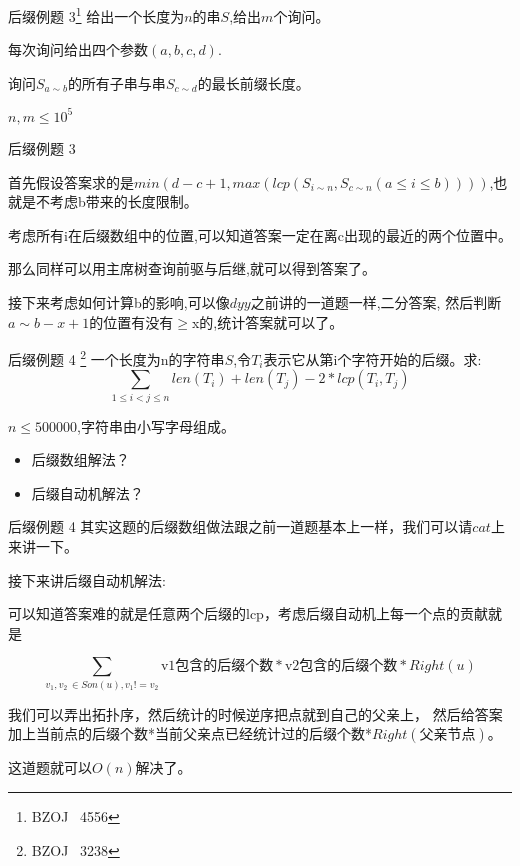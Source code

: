\documentclass[10pt]{beamer}
\begin{document}
	\begin{frame}{后缀例题 3\footnote{BZOJ $\,$ 4556}}
		给出一个长度为$n$的串$S$,给出$m$个询问。
		
		每次询问给出四个参数$(a,b,c,d)$.

		询问$S_{a \sim b}$的所有子串与串$S_{c \sim d}$的最长前缀长度。

		\vspace{3ex}

		$n,m \leq 10^5$
	\end{frame}
	\begin{frame}{后缀例题 3}
		
		首先假设答案求的是$min\left( d-c+1,max(lcp(S_{i \sim n},S_{c \sim n}(a \leq i \leq b)))\right)$,也就是不考虑b带来的长度限制。

		考虑所有i在后缀数组中的位置,可以知道答案一定在离c出现的最近的两个位置中。

		那么同样可以用主席树查询前驱与后继,就可以得到答案了。\pause
		
		\vspace{2ex}

		接下来考虑如何计算b的影响,可以像$dyy$之前讲的一道题一样,二分答案,
		然后判断$a \sim b-x+1$的位置有没有$\geq$x的,统计答案就可以了。

	\end{frame}
	\begin{frame}{后缀例题 4 \footnote{BZOJ $\,$ 3238}}
		一个长度为n的字符串$S$,令$T_i$表示它从第i个字符开始的后缀。求:
		$$\sum_{1 \leq i < j \leq n}len(T_i)+len(T_j)-2*lcp(T_i,T_j)$$

		\vspace{3ex}

		$n \leq 500000$,字符串由小写字母组成。

		\vspace{2ex}

		\begin{itemize}
			\item 后缀数组解法？

			\vspace{2ex}

			\item 后缀自动机解法？
		\end{itemize}
	\end{frame}
	\begin{frame}{后缀例题 4}
		其实这题的后缀数组做法跟之前一道题基本上一样，我们可以请$cat$上来讲一下。\pause

		\vspace{2ex}

		接下来讲后缀自动机解法:

		可以知道答案难的就是任意两个后缀的lcp，考虑后缀自动机上每一个点的贡献就是

		$$\sum_{v_1,v_2 \, \in Son(u),v_1!=v_2}\text{v1包含的后缀个数}*\text{v2包含的后缀个数}*Right(u)$$\pause

		我们可以弄出拓扑序，然后统计的时候逆序把点就到自己的父亲上，
		然后给答案加上当前点的后缀个数*当前父亲点已经统计过的后缀个数*$Right(\text{父亲节点})$。

		\vspace{2ex}

		这道题就可以$O(n)$解决了。
	\end{frame}
\end{document}
